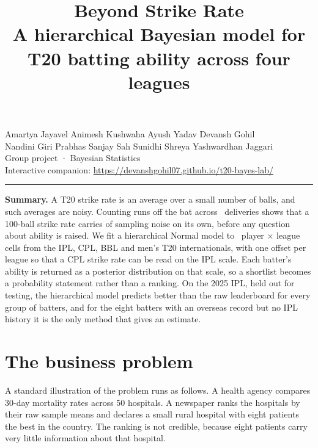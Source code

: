 \documentclass[11pt,a4paper]{article}
\title{\vspace{-1.4cm}\bfseries Beyond Strike Rate\\[2pt]
\large\normalfont A hierarchical Bayesian model for T20 batting ability across four leagues}
\author{}
\date{}
\begin{document}
\maketitle
\vspace{-2.2cm}
\begin{center}
{\normalsize\color{ink}
Amartya Jayavel \quad Animesh Kushwaha \quad Ayush Yadav \quad Devansh Gohil\\[4pt]
Nandini Giri \quad Prabhas Sanjay Sah \quad Sunidhi Shreya \quad Yashwardhan Jaggari}
\\[9pt]
{\small\color{muted}
Group project · Bayesian Statistics\\
Interactive companion: \url{https://devanshgohil07.github.io/t20-bayes-lab/}}
\end{center}
\vspace{6pt}
\hrule
\vspace{10pt}

\begin{callout}
\textbf{Summary.} A T20 strike rate is an average over a small number of balls, and such
averages are noisy. Counting runs off the bat across \nNdeliveries\ deliveries shows that a
100-ball strike rate carries  of sampling noise on its own,
before any question about ability is raised. We fit a hierarchical Normal model to \nNcells\
player $\times$ league cells from the IPL, CPL, BBL and men's T20 internationals, with one
offset per league so that a CPL strike rate can be read on the IPL scale. Each batter's ability
is returned as a posterior distribution on that scale, so a shortlist becomes a probability
statement rather than a ranking. On the 2025 IPL, held out for testing, the hierarchical model
predicts better than the raw leaderboard for every group of batters, and for the eight batters
with an overseas record but no IPL history it is the only method that gives an estimate.
\end{callout}

\section{The business problem}

A standard illustration of the problem runs as follows. A health agency compares 30-day
mortality rates across 50 hospitals. A newspaper ranks the hospitals by their raw sample means
and declares a small rural hospital with eight patients the best in the country. The ranking is
not credible, because eight patients carry very little information about that hospital.
\end{document}
